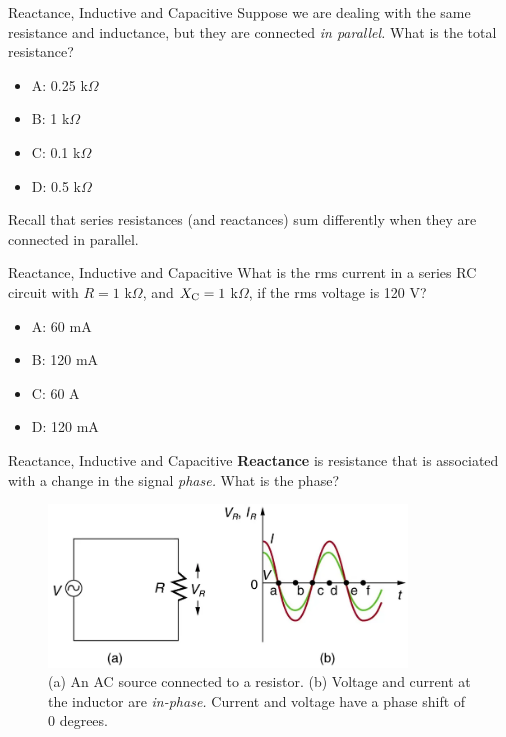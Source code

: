\documentclass{beamer}
\begin{document}
\begin{frame}{Reactance, Inductive and Capacitive}
Suppose we are dealing with the same resistance and inductance, but they are connected \textit{in parallel.}  What is the total resistance?
\begin{itemize}
\item A: 0.25 k$\Omega$
\item B: 1 k$\Omega$
\item C: 0.1 k$\Omega$
\item D: 0.5 k$\Omega$
\end{itemize}
\footnotesize
Recall that series resistances (and reactances) sum differently when they are connected in parallel.
\end{frame}

\begin{frame}{Reactance, Inductive and Capacitive}
What is the rms current in a series RC circuit with $R = 1$ k$\Omega$, and $X_{\rm C} = 1$ k$\Omega$, if the rms voltage is 120 V?
\begin{itemize}
\item A: 60 mA
\item B: 120 mA
\item C: 60 A
\item D: 120 mA
\end{itemize}
\end{frame}

\begin{frame}{Reactance, Inductive and Capacitive}
\small
\textbf{\alert{Reactance}} is resistance that is associated with a change in the signal \textit{phase.}  What is the phase?
\begin{figure}
\centering
\includegraphics[width=0.85\textwidth]{figures/phase4.png}
\caption{\label{fig:phase4} (a) An AC source connected to a resistor. (b) Voltage and current at the inductor are \textit{in-phase.}  Current and voltage have a phase shift of 0 degrees.}
\end{figure}
\end{frame}
\end{document}
